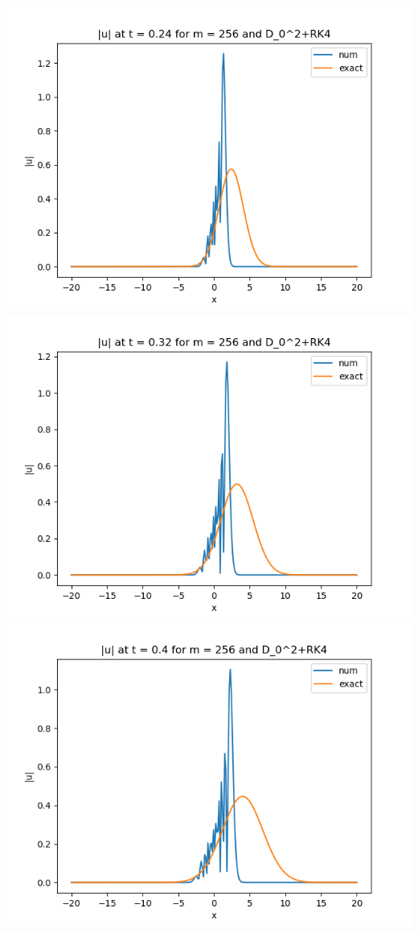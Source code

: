 \documentclass{article}
\begin{document}
\begin{enumerate}[label=(\alph*)]
\begin{center}
\end{center}
\begin{center}
	\includegraphics[scale=.3]{FINAL u_abs t = 0.24 m = 256 D02+RK4}
	\includegraphics[scale=.3]{FINAL u_abs t = 0.32 m = 256 D02+RK4}
	\includegraphics[scale=.3]{FINAL u_abs t = 0.4 m = 256 D02+RK4}

\end{center}
\end{enumerate}
\end{document}
